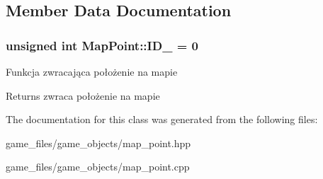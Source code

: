 \subsection{Member Data Documentation}
\subsubsection[{\texorpdfstring{I\+D\+\_\+}{ID_}}]{\setlength{\rightskip}{0pt plus 5cm}unsigned int Map\+Point\+::\+I\+D\+\_\+ = 0\hspace{0.3cm}{\ttfamily [static]}}\hypertarget{classMapPoint_a0ec6add3c90e5cd5421de9f488d5e681}{}\label{classMapPoint_a0ec6add3c90e5cd5421de9f488d5e681}
Funkcja zwracająca położenie na mapie \begin{DoxyReturn}{Returns}
zwraca położenie na mapie 
\end{DoxyReturn}


The documentation for this class was generated from the following files\+:\begin{DoxyCompactItemize}
\item 
game\+\_\+files/game\+\_\+objects/map\+\_\+point.\+hpp\item 
game\+\_\+files/game\+\_\+objects/map\+\_\+point.\+cpp\end{DoxyCompactItemize}
